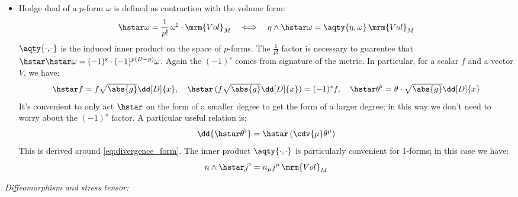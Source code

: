 \documentclass[a4paper
	,10pt
]{article}
\begin{document}
\begin{itemize}
	\item Hodge dual of a $p$-form $\omega$ is defined as contraction with the volume form:
	\begin{equation}
		\hstar\omega
		= \frac{1}{p!}\,
			\omega^\sharp \cdot \mrm{Vol}_M
	\quad\Longleftrightarrow\quad
		\eta\wedge \hstar\omega
		= \aqty{\eta,\omega} \,\mrm{Vol}_M
	\end{equation}
	$\aqty{\cdot,\cdot}$ is the induced inner product on the space of $p$-forms. 
	The $\frac{1}{p!}$ factor is necessary to guarentee that $\hstar\hstar\omega = (-1)^s\cdot(-1)^{p(D-p)} \omega$. Again the $(-1)^s$ comes from signature of the metric. In particular, for a scalar $f$ and a vector $V$, we have:
	\begin{equation}
		\hstar f
		= f\sqrt{\abs{g}} \dd[D]{x},
	\quad
		\hstar\,(f\sqrt{\abs{g}} \dd[D]{x})
		= (-1)^s f,
	\quad
		\hstar \theta^\flat
		= \theta\cdot \sqrt{\abs{g}} \dd[D]{x}
	\end{equation}
	It's convenient to only act $\hstar$ on the form of a smaller degree to get the form of a larger degree; in this way we don't need to worry about the $(-1)^s$ factor. 
	A particular useful relation is:
	\begin{equation}
		\dd{\hstar \theta^\flat}
		= \hstar\,(\cdv{\mu} \theta^\mu)
	\end{equation}
	This is derived around \eqref{eq:divergence_form}. The inner product $\aqty{\cdot,\cdot}$ is particularly convenient for 1-forms; in this case we have:
	\begin{equation}
		n \wedge\hstar j^\flat
		= n_\mu j^\mu \,\mrm{Vol}_M
	\end{equation}
	
	\end{itemize}
\textit{Diffeomorphism and stress tensor:}
	
\end{document}
